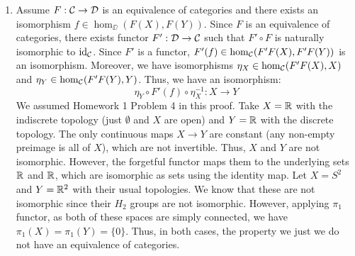 \documentclass[12pt]{article}
\begin{document}
\begin{solution}
\bbni 
\begin{enumerate}
    \item Assume $F: \mathcal{C} \to \mathcal{D}$ is an equivalence of categories and there exists an isomorphism $f \in \hom_\DD(F(X), F(Y))$. Since $F$ is an equivalence of categories, there exists functor $F': \mathcal{D} \to \mathcal{C}$ such that $F' \circ F$ is naturally isomorphic to $\operatorname{id}_{\mathcal{C}}$. Since $F'$ is a functor, $F'(f) \in \hom_{\mathcal{C}}(F'F(X), F'F(Y))$ is an isomorphism. Moreover, we have isomorphisms $\eta_X \in \hom_{\mathcal{C}}(F'F(X), X)$ and $\eta_Y \in \hom_{\mathcal{C}}(F'F(Y), Y)$. Thus, we have an isomorphism:
    \[\eta_Y \circ F'(f) \circ \eta_X^{-1}: X \to Y\]
    We assumed Homework 1 Problem 4 in this proof. \bbni
    Take $X = \mathbb R$ with the indiscrete topology (just $\emptyset$ and $X$ are open) and $Y = \mathbb R$ with the discrete topology. The only continuous maps $X \to Y$ are constant (any non-empty preimage is all of $X$), which are not invertible. Thus, $X$ and $Y$ are not isomorphic. However, the forgetful functor maps them to the underlying sets $\mathbb R$ and $\mathbb R$, which are isomorphic as sets using the identity map. \bbni
    Let $X = S^2$ and $Y = \mathbb R^2$ with their usual topologies. We know that these are not isomorphic since their $H_2$ groups are not isomorphic. However, applying $\pi_1$ functor, as both of these spaces are simply connected, we have $\pi_1(X) = \pi_1(Y) = \{0\}$. \bbni
    Thus, in both cases, the property we just we do not have an equivalence of categories.


\end{enumerate}
\end{solution}
\end{document}
